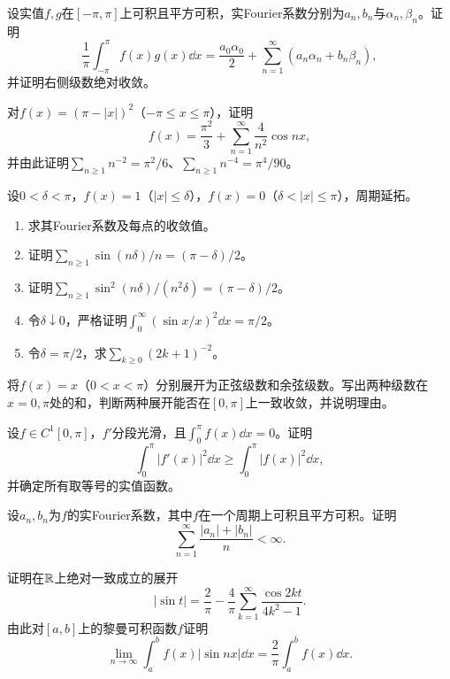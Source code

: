 设实值$f,g$在$[-\pi,\pi]$上可积且平方可积，实Fourier系数分别为$a_n,b_n$与$\alpha_n,\beta_n$。证明
\[
 \frac1\pi\int_{-\pi}^{\pi}f(x)g(x)\dd x
 =\frac{a_0\alpha_0}{2}+\sum_{n=1}^{\infty}(a_n\alpha_n+b_n\beta_n),
\]
并证明右侧级数绝对收敛。

对$f(x)=(\pi-|x|)^2$（$-\pi\le x\le\pi$），证明
\[
 f(x)=\frac{\pi^2}{3}+\sum_{n=1}^{\infty}\frac4{n^2}\cos nx,
\]
并由此证明$\sum_{n\ge1}n^{-2}=\pi^2/6$、$\sum_{n\ge1}n^{-4}=\pi^4/90$。

设$0<\delta<\pi$，$f(x)=1$（$|x|\le\delta$），$f(x)=0$（$\delta<|x|\le\pi$），周期延拓。
\begin{enumerate}[label=(\arabic*)]
\item 求其Fourier系数及每点的收敛值。
\item 证明$\sum_{n\ge1}\sin(n\delta)/n=(\pi-\delta)/2$。
\item 证明$\sum_{n\ge1}\sin^2(n\delta)/(n^2\delta)=(\pi-\delta)/2$。
\item 令$\delta\downarrow0$，严格证明$\int_0^\infty(\sin x/x)^2\dd x=\pi/2$。
\item 令$\delta=\pi/2$，求$\sum_{k\ge0}(2k+1)^{-2}$。
\end{enumerate}

将$f(x)=x$（$0<x<\pi$）分别展开为正弦级数和余弦级数。写出两种级数在$x=0,\pi$处的和，判断两种展开能否在$[0,\pi]$上一致收敛，并说明理由。

设$f\in C^1[0,\pi]$，$f'$分段光滑，且$\int_0^\pi f(x)\dd x=0$。证明
\[
 \int_0^\pi|f'(x)|^2\dd x\ge\int_0^\pi|f(x)|^2\dd x,
\]
并确定所有取等号的实值函数。

设$a_n,b_n$为$f$的实Fourier系数，其中$f$在一个周期上可积且平方可积。证明
\[
 \sum_{n=1}^{\infty}\frac{|a_n|+|b_n|}{n}<\infty.
\]

证明在$\mathbb R$上绝对一致成立的展开
\[
 |\sin t|=\frac2\pi-\frac4\pi\sum_{k=1}^{\infty}\frac{\cos2kt}{4k^2-1}.
\]
由此对$[a,b]$上的黎曼可积函数$f$证明
\[
 \lim_{n\to\infty}\int_a^bf(x)|\sin nx|\dd x
 =\frac2\pi\int_a^bf(x)\dd x.
\]



